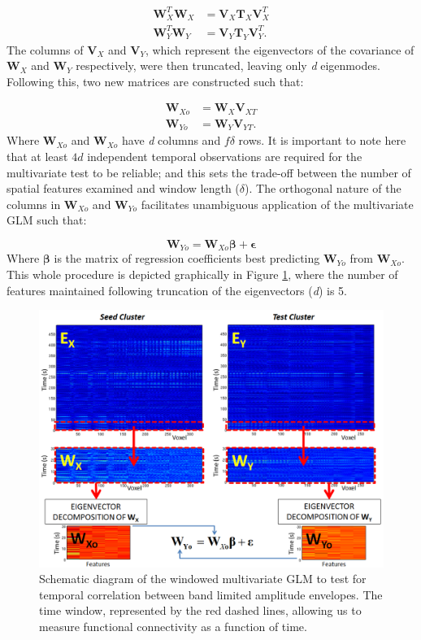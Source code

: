 \begin{align}
\mathbf{W}_{X}^T\mathbf{W}_{X} &= \mathbf{V}_X\mathbf{T}_X\mathbf{V}_X^T \\
\mathbf{W}_{Y}^T\mathbf{W}_{Y} &= \mathbf{V}_Y\mathbf{T}_Y\mathbf{V}_Y^T.
\end{align} The columns of $\mathbf{V}_X$ and $\mathbf{V}_Y$, which represent the eigenvectors of the covariance of $\mathbf{W}_X$ and $\mathbf{W}_Y$ respectively, were then truncated, leaving only \textit{d} eigenmodes. Following this, two new matrices are constructed such that:

\begin{align}
\mathbf{W}_{Xo} &= \mathbf{W}_X\mathbf{V}_{XT} \\
\mathbf{W}_{Yo} &= \mathbf{W}_Y\mathbf{V}_{YT}.
\end{align} Where $\mathbf{W}_{Xo}$ and $\mathbf{W}_{Xo}$ have \textit{d} columns and $f\delta$ rows. It is important to note here that at least $4d$ independent temporal observations are required for the multivariate test to be reliable; and this sets the trade-off between the number of spatial features examined and window length ($\delta$). The orthogonal nature of the columns in $\mathbf{W}_{Xo}$ and $\mathbf{W}_{Yo}$ facilitates unambiguous application of the multivariate GLM such that:

\begin{equation}
\mathbf{W}_{Yo} = \mathbf{W}_{Xo}\mathbf{\beta}+\mathbf{\epsilon}
\end{equation} Where $\mathbf{\beta}$ is the matrix of regression coefficients best predicting $\mathbf{W}_{Yo}$ from $\mathbf{W}_{Xo}$. This whole procedure is depicted graphically in Figure \ref{fig_4_1}, where the number of features maintained following truncation of the eigenvectors (\textit{d}) is 5. 

\begin{figure}[h!]
	\begin{center}
		\includegraphics[width=0.89\linewidth]{./images/chapter4/figure_1.png}\caption{Schematic diagram of the windowed multivariate GLM to test for temporal correlation between band limited amplitude envelopes. The time window, represented by the red dashed lines,  allowing us to measure  functional connectivity as a function of time.}\label{fig_4_1}
	\end{center}	
\end{figure}

